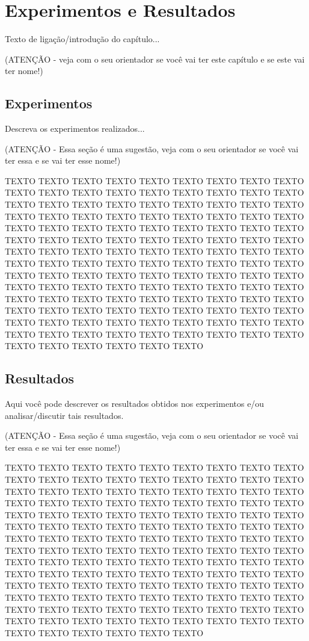 \chapter{Experimentos e Resultados} 
\label{cap:experimentos:resultados}

Texto de ligação/introdução do capítulo...

(ATENÇÃO - veja com o seu orientador se você vai ter este capítulo e se este vai ter nome!)

\section{Experimentos}
\label{cap:experimentos:sec:resultados:experimentos}

Descreva os experimentos realizados...

(ATENÇÃO - Essa seção é uma sugestão, veja com o seu orientador se você vai ter essa e se vai ter esse nome!)

TEXTO TEXTO TEXTO TEXTO TEXTO TEXTO TEXTO TEXTO TEXTO TEXTO TEXTO TEXTO TEXTO TEXTO TEXTO TEXTO TEXTO TEXTO TEXTO TEXTO TEXTO TEXTO TEXTO TEXTO TEXTO TEXTO TEXTO TEXTO TEXTO TEXTO TEXTO TEXTO TEXTO TEXTO TEXTO TEXTO TEXTO TEXTO TEXTO TEXTO TEXTO TEXTO TEXTO TEXTO TEXTO TEXTO TEXTO TEXTO TEXTO TEXTO TEXTO TEXTO TEXTO TEXTO TEXTO TEXTO TEXTO TEXTO TEXTO TEXTO TEXTO TEXTO TEXTO TEXTO TEXTO TEXTO TEXTO TEXTO TEXTO TEXTO TEXTO TEXTO TEXTO TEXTO TEXTO TEXTO TEXTO TEXTO TEXTO TEXTO TEXTO TEXTO TEXTO TEXTO TEXTO TEXTO TEXTO TEXTO TEXTO TEXTO TEXTO TEXTO TEXTO TEXTO TEXTO TEXTO TEXTO TEXTO TEXTO TEXTO TEXTO TEXTO TEXTO TEXTO TEXTO TEXTO TEXTO TEXTO TEXTO TEXTO TEXTO TEXTO TEXTO TEXTO TEXTO TEXTO TEXTO TEXTO TEXTO TEXTO TEXTO TEXTO TEXTO TEXTO TEXTO TEXTO TEXTO TEXTO TEXTO TEXTO TEXTO TEXTO

\section{Resultados}
\label{cap:experimentos:resultados:sec:resultados}

Aqui você pode descrever os resultados obtidos nos experimentos e/ou analisar/discutir tais resultados.

(ATENÇÃO - Essa seção é uma sugestão, veja com o seu orientador se você vai ter essa e se vai ter esse nome!)

TEXTO TEXTO TEXTO TEXTO TEXTO TEXTO TEXTO TEXTO TEXTO TEXTO TEXTO TEXTO TEXTO TEXTO TEXTO TEXTO TEXTO TEXTO TEXTO TEXTO TEXTO TEXTO TEXTO TEXTO TEXTO TEXTO TEXTO TEXTO TEXTO TEXTO TEXTO TEXTO TEXTO TEXTO TEXTO TEXTO TEXTO TEXTO TEXTO TEXTO TEXTO TEXTO TEXTO TEXTO TEXTO TEXTO TEXTO TEXTO TEXTO TEXTO TEXTO TEXTO TEXTO TEXTO TEXTO TEXTO TEXTO TEXTO TEXTO TEXTO TEXTO TEXTO TEXTO TEXTO TEXTO TEXTO TEXTO TEXTO TEXTO TEXTO TEXTO TEXTO TEXTO TEXTO TEXTO TEXTO TEXTO TEXTO TEXTO TEXTO TEXTO TEXTO TEXTO TEXTO TEXTO TEXTO TEXTO TEXTO TEXTO TEXTO TEXTO TEXTO TEXTO TEXTO TEXTO TEXTO TEXTO TEXTO TEXTO TEXTO TEXTO TEXTO TEXTO TEXTO TEXTO TEXTO TEXTO TEXTO TEXTO TEXTO TEXTO TEXTO TEXTO TEXTO TEXTO TEXTO TEXTO TEXTO TEXTO TEXTO TEXTO TEXTO TEXTO TEXTO TEXTO TEXTO TEXTO TEXTO TEXTO TEXTO TEXTO TEXTO

